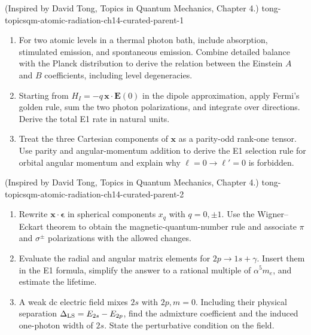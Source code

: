 \begin{enumerate}
  {(Inspired by David Tong, Topics in Quantum Mechanics, Chapter 4.)}
  {tong-topicsqm-atomic-radiation-ch14-curated-parent-1}
\begin{enumerate}
\item
For two atomic levels in a thermal photon bath, include absorption,
stimulated emission, and spontaneous emission.  Combine detailed balance
with the Planck distribution to derive the relation between the Einstein
\(A\) and \(B\) coefficients, including level degeneracies.
\item
Starting from \(H_I=-q\,\mathbf x\cdot\mathbf E(0)\) in the dipole
approximation, apply Fermi's golden rule, sum the two photon polarizations,
and integrate over directions.  Derive the total E1 rate in natural units.
\item
Treat the three Cartesian components of \(\mathbf x\) as a parity-odd
rank-one tensor.  Use parity and angular-momentum addition to derive the E1
selection rule for orbital angular momentum and explain why
\(\ell=0\to\ell'=0\) is forbidden.
\end{enumerate}

  {(Inspired by David Tong, Topics in Quantum Mechanics, Chapter 4.)}
  {tong-topicsqm-atomic-radiation-ch14-curated-parent-2}
\begin{enumerate}
\item
Rewrite \(\mathbf x\cdot\boldsymbol\epsilon\) in spherical components
\(x_q\) with \(q=0,\pm1\).  Use the Wigner--Eckart theorem to obtain the
magnetic-quantum-number rule and associate \(\pi\) and \(\sigma^\pm\)
polarizations with the allowed changes.
\item
Evaluate the radial and angular matrix elements for \(2p\to1s+\gamma\).
Insert them in the E1 formula, simplify the answer to a rational multiple of
\(\alpha^5m_e\), and estimate the lifetime.
\item
A weak dc electric field mixes \(2s\) with \(2p,m=0\).  Including their
physical separation \(\Delta_{\rm LS}=E_{2s}-E_{2p}\), find the admixture
coefficient and the induced one-photon width of \(2s\).  State the
perturbative condition on the field.
\end{enumerate}


\end{enumerate}
